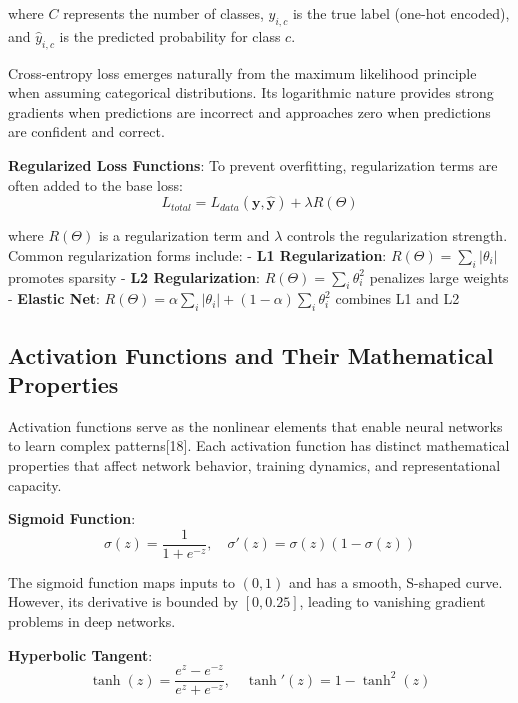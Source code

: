 \documentclass[11pt,a4paper]{report}
\begin{document}
where $C$ represents the number of classes, $y_{i,c}$ is the true label (one-hot encoded), and $\hat{y}_{i,c}$ is the predicted probability for class $c$.

Cross-entropy loss emerges naturally from the maximum likelihood principle when assuming categorical distributions. Its logarithmic nature provides strong gradients when predictions are incorrect and approaches zero when predictions are confident and correct.

\textbf{Regularized Loss Functions}: To prevent overfitting, regularization terms are often added to the base loss:
\begin{equation}
L_{total} = L_{data}(\mathbf{y}, \hat{\mathbf{y}}) + \lambda R(\Theta)
\end{equation}

where $R(\Theta)$ is a regularization term and $\lambda$ controls the regularization strength. Common regularization forms include:
- \textbf{L1 Regularization}: $R(\Theta) = \sum_{i} |\theta_i|$ promotes sparsity
- \textbf{L2 Regularization}: $R(\Theta) = \sum_{i} \theta_i^2$ penalizes large weights
- \textbf{Elastic Net}: $R(\Theta) = \alpha \sum_{i} |\theta_i| + (1-\alpha) \sum_{i} \theta_i^2$ combines L1 and L2

\subsection{Activation Functions and Their Mathematical Properties}

Activation functions serve as the nonlinear elements that enable neural networks to learn complex patterns[18]. Each activation function has distinct mathematical properties that affect network behavior, training dynamics, and representational capacity.

\textbf{Sigmoid Function}:
\begin{equation}
\sigma(z) = \frac{1}{1 + e^{-z}}, \quad \sigma'(z) = \sigma(z)(1 - \sigma(z))
\end{equation}

The sigmoid function maps inputs to $(0, 1)$ and has a smooth, S-shaped curve. However, its derivative is bounded by $[0, 0.25]$, leading to vanishing gradient problems in deep networks.

\textbf{Hyperbolic Tangent}:
\begin{equation}
\tanh(z) = \frac{e^z - e^{-z}}{e^z + e^{-z}}, \quad \tanh'(z) = 1 - \tanh^2(z)
\end{equation}
\end{document}
